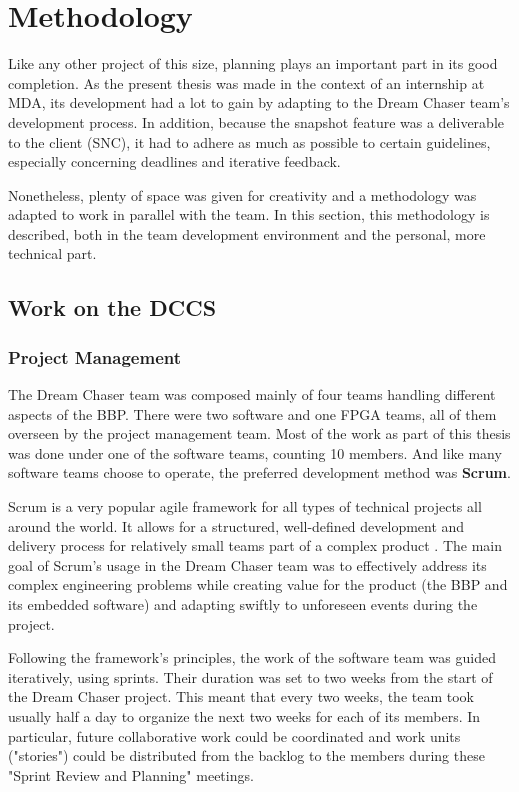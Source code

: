 {
\setlength{\parindent}{2em}
\chapter{Methodology}\label{cha:meth}
Like any other project of this size, planning plays an important part in its good completion. As the present thesis was made in the context of an internship at \gls{MDA}, its development had a lot to gain by adapting to the Dream Chaser team's development process. In addition, because the snapshot feature was a deliverable to the client (\gls{SNC}), it had to adhere as much as possible to certain guidelines, especially concerning deadlines and iterative feedback. 

Nonetheless, plenty of space was given for creativity and a methodology was adapted to work in parallel with the team. In this section, this methodology is described, both in the team development environment and the personal, more technical part.

\section{Work on the DCCS}
\subsection*{Project Management}
The Dream Chaser team was composed mainly of four teams handling different aspects of the \gls{BBP}. There were two software and one FPGA teams, all of them overseen by the project management team. Most of the work as part of this thesis was done under one of the software teams, counting 10 members. And like many software teams choose to operate, the preferred development method was \textbf{Scrum}. 

Scrum is a very popular agile framework for all types of technical projects all around the world. It allows for a structured, well-defined development and delivery process for relatively small teams part of a complex product \cite{book:scrum}. The main goal of Scrum's usage in the Dream Chaser team was to effectively address its complex engineering problems while creating value for the product (the BBP and its embedded software) and adapting swiftly to unforeseen events during the project.

Following the framework's principles, the work of the software team was guided iteratively, using sprints. Their duration was set to two weeks from the start of the Dream Chaser project. This meant that every two weeks, the team took usually half a day to organize the next two weeks for each of its members. In particular, future collaborative work could be coordinated and work units ("stories") could be distributed from the backlog to the members during these "Sprint Review and Planning" meetings.

}
